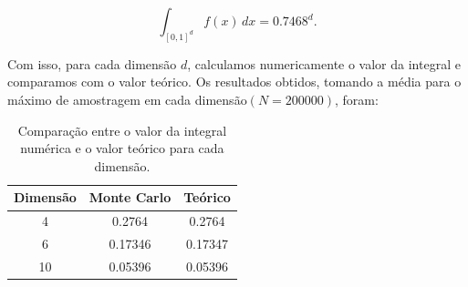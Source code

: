 \documentclass[a4paper, 12pt]{article}
\begin{document}
\begin{equation}
    \int_{[0,1]^d} f(x) \, dx = 0.7468^{d}.
\end{equation}

Com isso, para cada dimensão \(d\), calculamos numericamente o valor da integral e comparamos com o valor 
teórico. Os resultados obtidos, tomando a média para o máximo de amostragem em cada dimensão\((N = 200000)\), foram:

\begin{table}
    \centering
    \begin{tabular}{|c|c|c|}
        \hline
        Dimensão & Monte Carlo & Teórico \\
        \hline
        4 & 0.2764 & 0.2764 \\
        6 & 0.17346 & 0.17347 \\
        10 & 0.05396 & 0.05396 \\
        \hline
    \end{tabular}
    \caption{Comparação entre o valor da integral numérica e o valor teórico para cada dimensão.}
\end{table}
\end{document}
